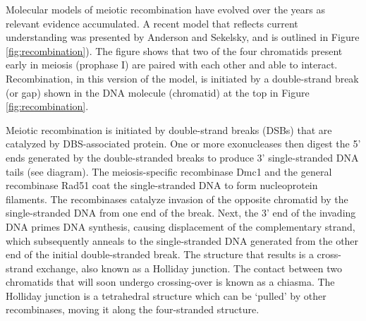 Molecular models of meiotic recombination have evolved over the years as relevant evidence accumulated. A recent model that reflects current understanding was presented by Anderson and Sekelsky, and is outlined in Figure \ref{fig:recombination}). The figure shows that two of the four chromatids present early in meiosis (prophase I) are paired with each other and able to interact. Recombination, in this version of the model, is initiated by a double-strand break (or gap) shown in the DNA molecule (chromatid) at the top in Figure \ref{fig:recombination}.

Meiotic recombination is initiated by double-strand breaks (DSBs) that are catalyzed by DBS-associated protein. One or more exonucleases then digest the 5' ends generated by the double-stranded breaks to produce 3' single-stranded DNA tails (see diagram). The meiosis-specific recombinase Dmc1 and the general recombinase Rad51 coat the single-stranded DNA to form nucleoprotein filaments. The recombinases catalyze invasion of the opposite chromatid by the single-stranded DNA from one end of the break. Next, the 3' end of the invading DNA primes DNA synthesis, causing displacement of the complementary strand, which subsequently anneals to the single-stranded DNA generated from the other end of the initial double-stranded break. The structure that results is a cross-strand exchange, also known as a Holliday junction. The contact between two chromatids that will soon undergo crossing-over is known as a chiasma. The Holliday junction is a tetrahedral structure which can be `pulled' by other recombinases, moving it along the four-stranded structure.


